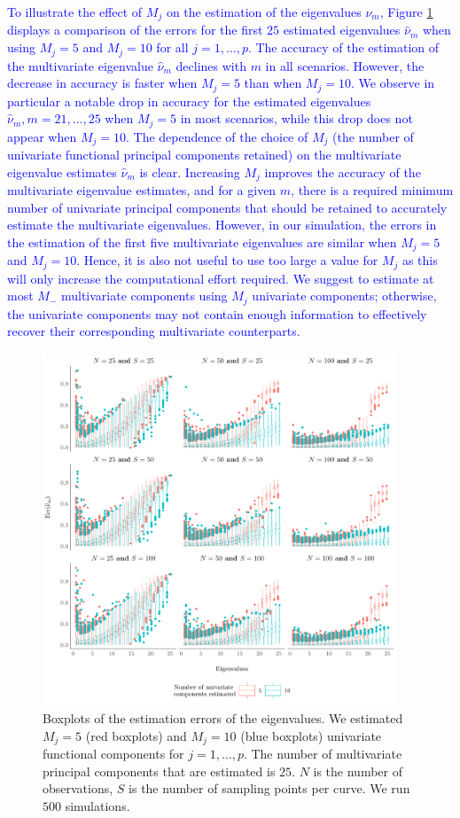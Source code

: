 \textcolor{blue}{To illustrate the effect of $M_j$ on the estimation of the eigenvalues $\nu_m$, Figure \ref{fig:ncomp} displays a comparison of the errors for the first $25$ estimated eigenvalues $\widehat{\nu}_m$ when using $M_j = 5$ and $M_j = 10$ for all $j = 1, \ldots, p$. The accuracy of the estimation of the multivariate eigenvalue $\widehat{\nu}_m$ declines with $m$ in all scenarios. However, the decrease in accuracy is faster when $M_j = 5$ than when $M_j = 10$. We observe in particular a notable drop in accuracy for the estimated eigenvalues $\widehat{\nu}_m, m = 21, \dots, 25$ when $M_j = 5$ in most scenarios, while this drop does not appear when $M_j = 10$. The dependence of the choice of $M_j$ (the number of univariate functional principal components retained) on the multivariate eigenvalue estimates $\widehat{\nu}_m$ is clear. Increasing $M_j$ improves the accuracy of the multivariate eigenvalue estimates, and for a given $m$, there is a required minimum number of univariate principal components that should be retained to accurately estimate the multivariate eigenvalues. However, in our simulation, the errors in the estimation of the first five multivariate eigenvalues are similar when $M_j = 5$ and $M_j = 10$. Hence, it is also not useful to use too large a value for $M_j$ as this will only increase the computational effort required. We suggest to estimate at most $M_{-}$ multivariate components using $M_j$ univariate components; otherwise, the univariate components may not contain enough information to effectively recover their corresponding multivariate counterparts.}
\begin{figure}
     \centering
    \includegraphics[width=0.94\textwidth]{figures/ncomp.pdf}
    \caption{Boxplots of the estimation errors of the eigenvalues. We estimated $M_j = 5$ (red boxplots) and $M_j = 10$ (blue boxplots) univariate functional components for $j = 1, \dots, p$. The number of multivariate principal components that are estimated is $25$. $N$ is the number of observations, $S$ is the number of sampling points per curve. We run $500$ simulations.}
    \label{fig:ncomp}
\end{figure}

